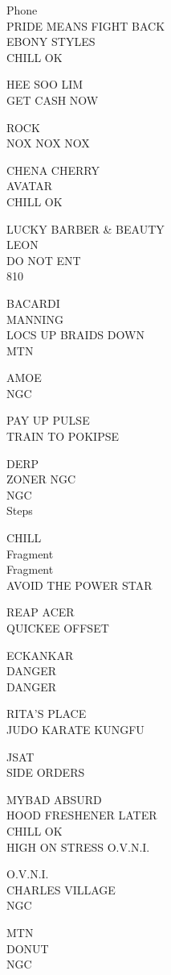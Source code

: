 \documentclass[10pt,letterpaper]{article}
\begin{document}
Phone\\
PRIDE MEANS FIGHT BACK\\
EBONY STYLES\\
CHILL OK

HEE SOO LIM\\
GET CASH NOW

ROCK\\
NOX NOX NOX

CHENA CHERRY\\
AVATAR\\
CHILL OK

LUCKY BARBER \& BEAUTY\\
LEON\\
DO NOT ENT\\
810

BACARDI\\
MANNING\\
LOCS UP BRAIDS DOWN\\
MTN

AMOE\\
NGC

PAY UP PULSE\\
TRAIN TO POKIPSE

DERP\\
ZONER NGC\\
NGC\\
Steps

CHILL\\
Fragment\\
Fragment\\
AVOID THE POWER STAR

REAP ACER\\
QUICKEE OFFSET

ECKANKAR\\
DANGER\\
DANGER

RITA'S PLACE\\
JUDO KARATE KUNGFU

JSAT\\
SIDE ORDERS

MYBAD ABSURD\\
HOOD FRESHENER LATER\\
CHILL OK\\
HIGH ON STRESS O.V.N.I.

O.V.N.I.\\
CHARLES VILLAGE\\
NGC

MTN\\
DONUT\\
NGC
\end{document}
